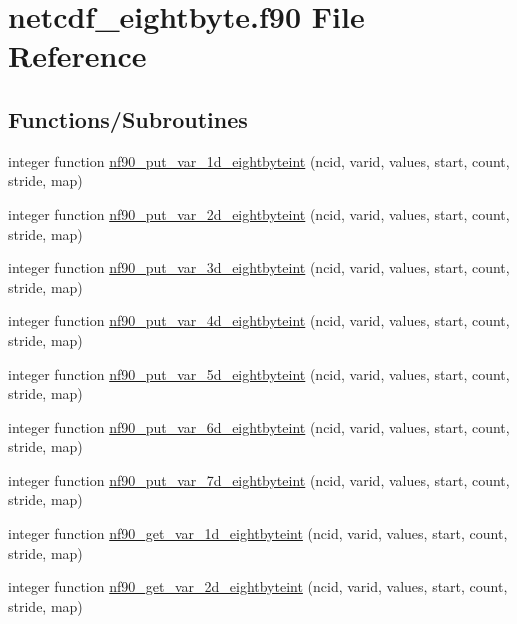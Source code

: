 \hypertarget{netcdf__eightbyte_8f90}{}\section{netcdf\+\_\+eightbyte.\+f90 File Reference}
\label{netcdf__eightbyte_8f90}
\subsection*{Functions/\+Subroutines}
\begin{DoxyCompactItemize}
\item 
integer function \hyperlink{netcdf__eightbyte_8f90_a47c837921b0c4c1085340afa2908bd27}{nf90\+\_\+put\+\_\+var\+\_\+1d\+\_\+eightbyteint} (ncid, varid, values, start, count, stride, map)
\item 
integer function \hyperlink{netcdf__eightbyte_8f90_a5f74fbc3c4b758731991344b922e79f9}{nf90\+\_\+put\+\_\+var\+\_\+2d\+\_\+eightbyteint} (ncid, varid, values, start, count, stride, map)
\item 
integer function \hyperlink{netcdf__eightbyte_8f90_a8cc31a27809898ae558570386d71fd3c}{nf90\+\_\+put\+\_\+var\+\_\+3d\+\_\+eightbyteint} (ncid, varid, values, start, count, stride, map)
\item 
integer function \hyperlink{netcdf__eightbyte_8f90_a2fcc7dafad70cffd89123ddbd491b3d0}{nf90\+\_\+put\+\_\+var\+\_\+4d\+\_\+eightbyteint} (ncid, varid, values, start, count, stride, map)
\item 
integer function \hyperlink{netcdf__eightbyte_8f90_a7c70c2c6493acd29cd6e7ac1ce969b00}{nf90\+\_\+put\+\_\+var\+\_\+5d\+\_\+eightbyteint} (ncid, varid, values, start, count, stride, map)
\item 
integer function \hyperlink{netcdf__eightbyte_8f90_a593864f2f5ed97b55185c8e459fc3760}{nf90\+\_\+put\+\_\+var\+\_\+6d\+\_\+eightbyteint} (ncid, varid, values, start, count, stride, map)
\item 
integer function \hyperlink{netcdf__eightbyte_8f90_a51868f926ef0b973025994cd6c505ceb}{nf90\+\_\+put\+\_\+var\+\_\+7d\+\_\+eightbyteint} (ncid, varid, values, start, count, stride, map)
\item 
integer function \hyperlink{netcdf__eightbyte_8f90_ac7f1c7b59c40bf98465096bf2de86167}{nf90\+\_\+get\+\_\+var\+\_\+1d\+\_\+eightbyteint} (ncid, varid, values, start, count, stride, map)
\item 
integer function \hyperlink{netcdf__eightbyte_8f90_ac52730b7beb0dfd1e6350756edbd2168}{nf90\+\_\+get\+\_\+var\+\_\+2d\+\_\+eightbyteint} (ncid, varid, values, start, count, stride, map)

\end{DoxyCompactItemize}
